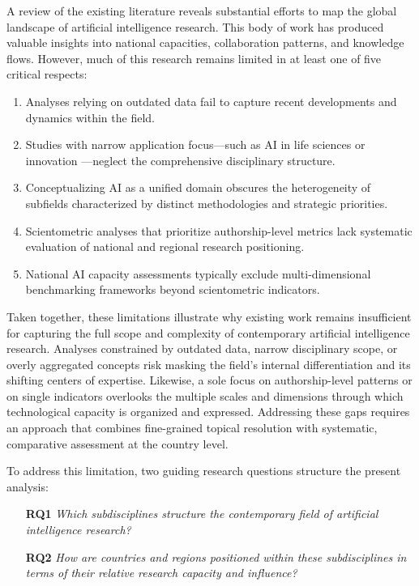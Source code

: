 \documentclass{article}
\begin{document}
A review of the existing literature reveals substantial efforts to map the global landscape of artificial intelligence research. This body of work has produced valuable insights into national capacities, collaboration patterns, and knowledge flows. However, much of this research remains limited in at least one of five critical respects:
\begin{enumerate}
	\item Analyses relying on outdated data fail to capture recent developments and dynamics within the field. \cite{niu2016global}
	\item Studies with narrow application focus—such as AI in life sciences \cite{schmallenbach2024global} or innovation \cite{mariani2023artificial}—neglect the comprehensive disciplinary structure.
	\item Conceptualizing AI as a unified domain obscures the heterogeneity of subfields characterized by distinct methodologies and strategic priorities. \cite{almarzouqi2024comparative,cao2020international, vinayak2023signatures, alshebli2022beijing, hu2020global}
	\item Scientometric analyses that prioritize authorship-level metrics lack systematic evaluation of national and regional research positioning.
	\item National AI capacity assessments typically exclude multi-dimensional benchmarking frameworks beyond scientometric indicators. \cite{ozkaya2023analysis}
\end{enumerate}



Taken together, these limitations illustrate why existing work remains insufficient for capturing the full scope and complexity of contemporary artificial intelligence research. Analyses constrained by outdated data, narrow disciplinary scope, or overly aggregated concepts risk masking the field’s internal differentiation and its shifting centers of expertise. Likewise, a sole focus on authorship-level patterns or on single indicators overlooks the multiple scales and dimensions through which technological capacity is organized and expressed. Addressing these gaps requires an approach that combines fine-grained topical resolution with systematic, comparative assessment at the country level.


To address this limitation, two guiding research questions structure the present analysis:

\begin{enumerate}
	\item[\textbf{RQ1}] \emph{Which subdisciplines structure the contemporary field of artificial intelligence research?}
	\item[\textbf{RQ2}] \emph{How are countries and regions positioned within these subdisciplines in terms of their relative research capacity and influence?}
\end{enumerate}
\end{document}
